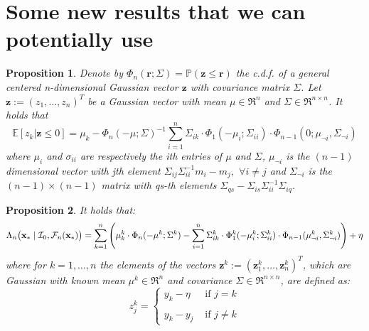 \documentclass{article} %
\newcommand{\I}{\mathcal{I}}
\newcommand{\E}{\mathbb{E}}
\newcommand{\Prob}{\mathbb{P}}
\newcommand{\future}{\mathcal{F}}
\newcommand{\bz}{\textbf{z}}
\newtheorem{proposition}{Proposition}
\begin{document}




 \section{Some new results that we can potentially use}

\begin{proposition}
Denote by  $\Phi_n (\textbf{r}; \Sigma) = \Prob(\bz \leq \textbf{r})$ the c.d.f. of a general  centered n-dimensional Gaussian vector $\bz$ with covariance matrix $\Sigma$. Let $\bz := (z_1,\dots,z_n)^T$ be a Gaussian vector with mean $\mu \in \Re^n$ and $\Sigma \in \Re^{n\times n}$. It holds that
\begin{equation} \nonumber
\E [ z_k|\bz \leq 0] = \mu_k -  \Phi_n ( -\mu; \Sigma)^{-1} \sum_{i=1}^n \Sigma_{ik} \cdot \Phi_1(-\mu_i;\Sigma_{ii}) \cdot \Phi_{n-1}(0;\mu_{\neg i}, \Sigma_{\neg i})
\end{equation}
 where $\mu_i$ and $\sigma_{ii}$ are respectively the ith entries of $\mu$ and $\Sigma$, $\mu_{\neg i}$ is the $(n-1)$ dimensional vector with jth element $\Sigma_{ij}\Sigma_{ii}^{-1}m_i -m_j,$ $\forall i\neq j$  and $\Sigma_{\neg i}$ is the $(n-1) \times (n-1)$ matrix with qs-th elements $\Sigma_{qs} - \Sigma_{is} \Sigma_{ii}^{-1} \Sigma_{iq}$.  
\end{proposition}


\begin{proposition}\label{prop:tallis}
It holds that:
\begin{equation} \nonumber
\Lambda_n \bigl(\latentVector_* \mid \I_0, \future_{n}(\latentVector_*) \bigr) = \sum_{k=1}^n \left(  \mu^k_k \cdot \Phi_n ( -\mu^k; \Sigma^k) -  \sum_{i=1}^n \Sigma^k_{ik} \cdot \Phi^k_1(-\mu^k_i;\Sigma^k_{ii}) \cdot \Phi_{n-1}(\mu^k_{\neg i}, \Sigma^k_{\neg i}) \right) + \eta
\end{equation}
where for $k=1,\dots,n$ the elements of the vectors $\bz^k:= (\bz^k_1,\dots,\bz^k_n)^T$, which are Gaussian with known mean $\mu^k\in \Re^{n}$ and covariance $\Sigma \in \Re^{n \times n}$, are defined as:
$$z_j^k= \left\{ \begin{array}{lcl}
y_k - \eta & \mbox{ if } j=k \\
  \\
y_k - y_j  &   \mbox{ if } j \neq k
\end{array}
\right.$$
\end{proposition}
\end{document}
